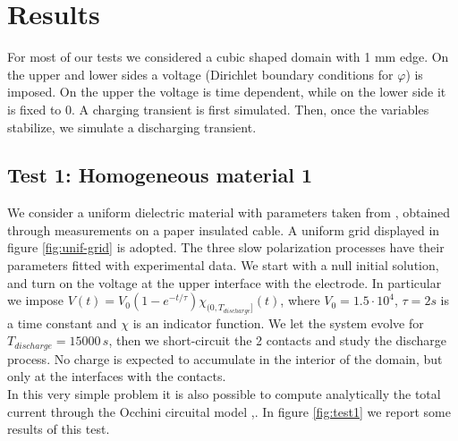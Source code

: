 \documentclass[11pt,a4paper]{article}
\begin{document}
\section{Results}
For most of our tests we considered a cubic shaped domain with 1 mm edge. On the upper and lower sides a voltage (Dirichlet boundary conditions for \(\varphi\)) is imposed. On the upper the voltage is time dependent, while on the lower side it is fixed to 0. A charging transient is first simulated. Then, once the variables stabilize, we simulate a discharging transient.
\subsection{Test 1: Homogeneous material 1}
We consider a uniform dielectric material with parameters taken from \cite{en14248323}, obtained through measurements on a paper insulated cable. A uniform grid displayed in figure \ref{fig:unif-grid} is adopted. The three slow polarization processes have their parameters fitted with experimental data. We start with a null initial solution, and turn on the voltage at the upper interface with the electrode. In particular we impose \(V(t)=V_0(1-e^{-t/\tau})\chi_{(0,T_{discharge}]}(t)\), where \(V_0 = 1.5\cdot 10^4\), \(\tau=2 s\) is a time constant and \(\chi\) is an indicator function. We let the system evolve for \(T_{discharge}=15000\,s\), then we short-circuit the 2 contacts and study the discharge process. No charge is expected to accumulate in the interior of the domain, but only at the interfaces with the contacts.\\
In this very simple problem it is also possible to compute analytically the total current through the Occhini circuital model \cite{4073280},\cite{en14248323}. In figure \ref{fig:test1} we report some results of this test.
\end{document}
